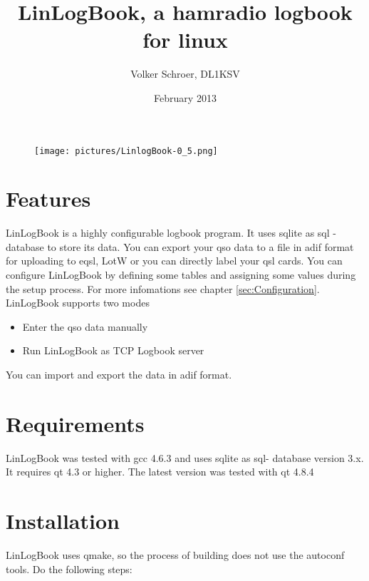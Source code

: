 \documentclass[a4paper,11pt]{article}
\title{LinLogBook, a hamradio logbook for linux}
\author{Volker Schroer, DL1KSV}
\date{February 2013}
\begin{document}
\begin{titlepage}


\maketitle
\begin{figure}[h]
	\centering
\texttt{[image: pictures/LinlogBook-0\_5.png]}
\end{figure}
\end{titlepage}
\tableofcontents
\newpage


\section{Features}

LinLogBook is a highly configurable logbook program. It uses sqlite as sql -
database to store its data.
You can export your qso data to a file in adif format for uploading to eqsl, LotW
or you can directly label your qsl cards.
You can configure LinLogBook by defining some tables and assigning some values during the setup process. For more infomations see chapter \ref{sec:Configuration}.
LinLogBook supports two modes
\begin{itemize}
\item Enter the qso data manually
\item Run LinLogBook as TCP Logbook server
\end{itemize}
You can import and export the data in adif format.
\section{Requirements}
LinLogBook was tested with gcc 4.6.3 and uses sqlite as sql- database version
3.x. It requires qt 4.3 or higher. The latest version was tested with qt 4.8.4
\section{Installation}
LinLogBook uses qmake, so the process of building does not use the autoconf
tools.
Do the following steps:
\end{document}
